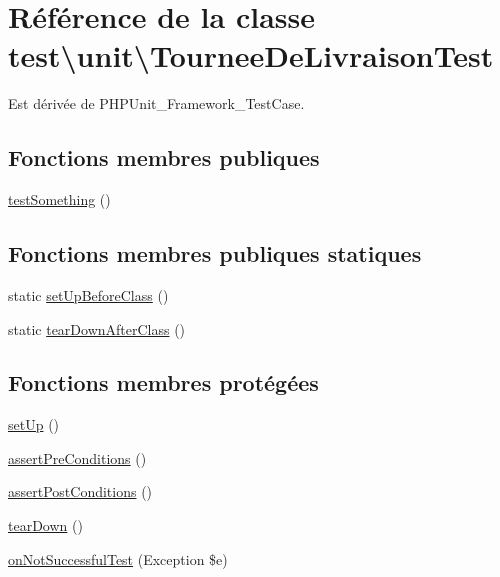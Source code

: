 \hypertarget{classtest_1_1unit_1_1TourneeDeLivraisonTest}{}\section{Référence de la classe test\textbackslash{}unit\textbackslash{}Tournee\+De\+Livraison\+Test}
\label{classtest_1_1unit_1_1TourneeDeLivraisonTest}


Est dérivée de P\+H\+P\+Unit\+\_\+\+Framework\+\_\+\+Test\+Case.

\subsection*{Fonctions membres publiques}
\begin{DoxyCompactItemize}
\item 
\hyperlink{classtest_1_1unit_1_1TourneeDeLivraisonTest_a11021bb8e3d72b1f9ff4d0e1d7487a99}{test\+Something} ()
\end{DoxyCompactItemize}
\subsection*{Fonctions membres publiques statiques}
\begin{DoxyCompactItemize}
\item 
static \hyperlink{classtest_1_1unit_1_1TourneeDeLivraisonTest_a0f0220962cf1e227a62011bdc12c693b}{set\+Up\+Before\+Class} ()
\item 
static \hyperlink{classtest_1_1unit_1_1TourneeDeLivraisonTest_a796b04ebdf479d588d77a48a74c87b28}{tear\+Down\+After\+Class} ()
\end{DoxyCompactItemize}
\subsection*{Fonctions membres protégées}
\begin{DoxyCompactItemize}
\item 
\hyperlink{classtest_1_1unit_1_1TourneeDeLivraisonTest_a9b84cde6e5ba0bb12a5dfbcd552ba80d}{set\+Up} ()
\item 
\hyperlink{classtest_1_1unit_1_1TourneeDeLivraisonTest_a1c37cc25b6ee06da4fe6f1d701ed14de}{assert\+Pre\+Conditions} ()
\item 
\hyperlink{classtest_1_1unit_1_1TourneeDeLivraisonTest_ad3cfb517b8c1ffd2e182f1b8b526d17b}{assert\+Post\+Conditions} ()
\item 
\hyperlink{classtest_1_1unit_1_1TourneeDeLivraisonTest_a6a1f1ccbefc10dce1c979a619ca61359}{tear\+Down} ()
\item 
\hyperlink{classtest_1_1unit_1_1TourneeDeLivraisonTest_a149d3b7b377cf260a7aa0cd2391578cf}{on\+Not\+Successful\+Test} (Exception \$e)
\end{DoxyCompactItemize}


